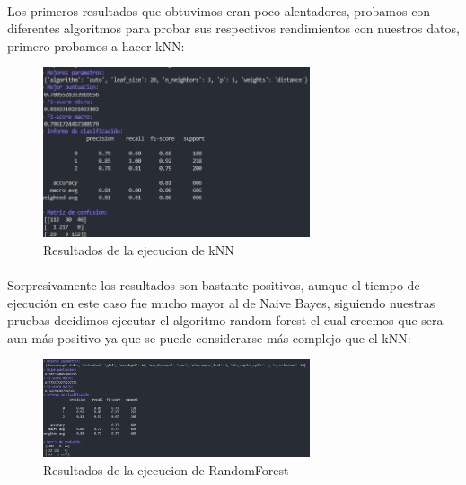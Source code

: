 \documentclass{report}
\begin{document}
                \paragraph*{}{
                Los primeros resultados que obtuvimos eran poco alentadores, probamos con diferentes algoritmos para probar sus respectivos rendimientos con nuestros datos, primero probamos a hacer kNN:
                }
                \begin{figure}[H]
                    \centering
                    \includegraphics[width=0.7\textwidth]{img/kNNSMOTE.png}
                    \caption{Resultados de la ejecucion de kNN}
                \end{figure}
                \paragraph*{}{
                   Sorpresivamente los resultados son bastante positivos, aunque el tiempo de ejecución en este caso fue mucho mayor al de Naive Bayes, siguiendo nuestras pruebas decidimos ejecutar el algoritmo random forest el cual creemos que sera aun más positivo ya que se puede considerarse más complejo que el kNN:
                }
                \begin{figure}[H]
                    \centering
                    \includegraphics[width=0.7\textwidth]{img/randomForestSMOTE.png}
                    \caption{Resultados de la ejecucion de RandomForest}
                \end{figure}
\end{document}
